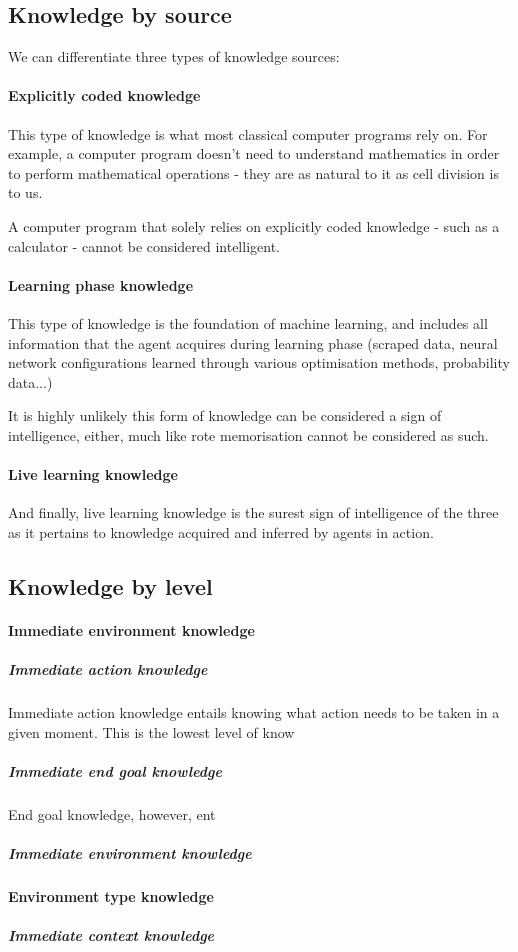 \documentclass[masterthesis]{fer}
\begin{document}
\subsection{Knowledge by source}
We can differentiate three types of knowledge sources:
\paragraph{Explicitly coded knowledge}
This type of knowledge is what most classical computer programs rely on. For example, a computer program doesn't need to understand mathematics in order to perform mathematical operations - they are as natural to it as cell division is to us.

A computer program that solely relies on explicitly coded knowledge - such as a calculator - cannot be considered intelligent.
\paragraph{Learning phase knowledge}
This type of knowledge is the foundation of machine learning, and includes all information that the agent acquires during learning phase (scraped data, neural network configurations learned through various optimisation methods, probability data...)

It is highly unlikely this form of knowledge can be considered a sign of intelligence, either, much like rote memorisation cannot be considered as such.
\paragraph{Live learning knowledge}
And finally, live learning knowledge is the surest sign of intelligence of the three as it pertains to knowledge acquired and inferred by agents in action.
\subsection{Knowledge by level}

\paragraph{Immediate environment knowledge}
\subparagraph{Immediate action knowledge}
Immediate action knowledge entails knowing what action needs to be taken in a given moment. This is the lowest level of know
\subparagraph{Immediate end goal knowledge}
End goal knowledge, however, ent
\subparagraph{Immediate environment knowledge}
\paragraph{Environment type knowledge}
\subparagraph{Immediate context knowledge}
\end{document}
